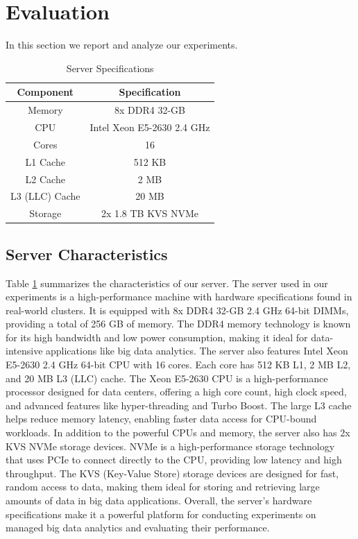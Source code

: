 \section{Evaluation}
\label{sec:eval}

In this section we report and analyze our experiments.

\begin{table}[thbp]
  \centering
  \caption{Server Specifications}
  \label{tab:server-specs}
  \begin{tabular}{|c|c|}
    \hline
    \textbf{Component} & \textbf{Specification} \\
    \hline
    Memory & 8x DDR4 32-GB \\
    CPU & Intel Xeon E5-2630 2.4 GHz \\
    Cores & 16 \\
    L1 Cache & 512 KB \\
    L2 Cache & 2 MB \\
    L3 (LLC) Cache & 20 MB \\
    Storage & 2x 1.8 TB KVS NVMe \\
    \hline
  \end{tabular}
\end{table}

\subsection{Server Characteristics}
Table \ref{tab:server-specs} summarizes the characteristics of our server.
The server used in our experiments is a high-performance machine with
hardware specifications found in real-world clusters.
It is equipped with 8x DDR4 32-GB 2.4 GHz 64-bit DIMMs, providing a
total of 256 GB of memory. The DDR4 memory technology is known for its
high bandwidth and low power consumption, making it ideal for
data-intensive applications like big data analytics. The server also
features Intel Xeon E5-2630 2.4 GHz 64-bit CPU with 16 cores. 
Each core has 512 KB L1, 2 MB L2, and 20 MB L3 (LLC) cache.
The Xeon E5-2630 CPU is a high-performance processor designed for data
centers, offering a high core count, high clock speed, and advanced
features like hyper-threading and Turbo Boost. The large L3 cache
helps reduce memory latency, enabling faster data access for CPU-bound
workloads. In addition to the powerful CPUs and memory, the server
also has 2x KVS NVMe storage devices. NVMe is a high-performance
storage technology that uses PCIe to connect directly to the CPU,
providing low latency and high throughput. The KVS (Key-Value Store)
storage devices are designed for fast, random access to data, making
them ideal for storing and retrieving large amounts of data in big
data applications. Overall, the server's hardware specifications make
it a powerful platform for conducting experiments on managed big data
analytics and evaluating their performance.

